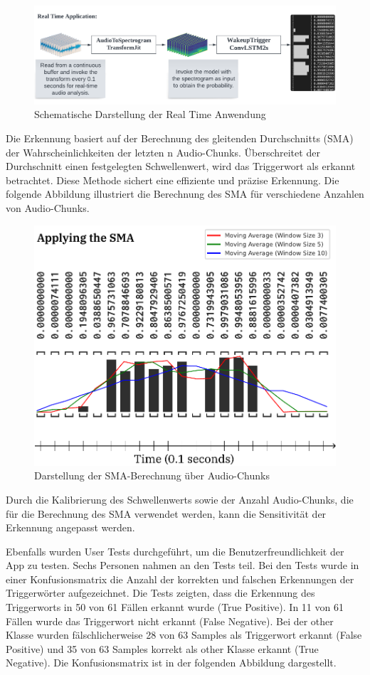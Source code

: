 \documentclass[11pt,a4paper]{article}
\begin{document}
\begin{figure}[H]
\centering
\includegraphics[width=1.0\linewidth, trim=0pt 10pt 0pt 15pt, clip]{img/realtime-application.pdf}
\caption{Schematische Darstellung der Real Time Anwendung}
\end{figure}

\noindent
Die Erkennung basiert auf der Berechnung des gleitenden Durchschnitts (SMA) der Wahrscheinlichkeiten der letzten n Audio-Chunks. Überschreitet der Durchschnitt einen festgelegten Schwellenwert, wird das Triggerwort als erkannt betrachtet. Diese Methode sichert eine effiziente und präzise Erkennung. Die folgende Abbildung illustriert die Berechnung des SMA für verschiedene Anzahlen von Audio-Chunks.

\begin{figure}[H]
\centering
\includegraphics[width=.5\linewidth]{img/sma.pdf}
\caption{Darstellung der SMA-Berechnung über Audio-Chunks}
\end{figure}

\noindent
Durch die Kalibrierung des Schwellenwerts sowie der Anzahl Audio-Chunks, die für die Berechnung des SMA verwendet werden, kann die Sensitivität der Erkennung angepasst werden.

\noindent \newline
Ebenfalls wurden User Tests durchgeführt, um die Benutzerfreundlichkeit der App zu testen. Sechs Personen nahmen an den Tests teil. Bei den Tests wurde in einer Konfusionsmatrix die Anzahl der korrekten und falschen Erkennungen der Triggerwörter aufgezeichnet. Die Tests zeigten, dass die Erkennung des Triggerworts in 50 von 61 Fällen erkannt wurde (True Positive). In 11 von 61 Fällen wurde das Triggerwort nicht erkannt (False Negative). Bei der other Klasse wurden fälschlicherweise 28 von 63 Samples als Triggerwort erkannt (False Positive) und 35 von 63 Samples korrekt als other Klasse erkannt (True Negative). Die Konfusionsmatrix ist in der folgenden Abbildung dargestellt.
\end{document}
